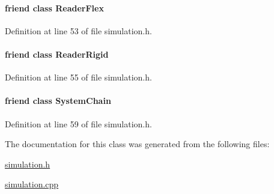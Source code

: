 \paragraph[{Reader\+Flex}]{\setlength{\rightskip}{0pt plus 5cm}friend class {\bf Reader\+Flex}\hspace{0.3cm}{\ttfamily [friend]}}\label{classmknix_1_1_simulation_a1150cceac3e81192653459c61f428621}


Definition at line 53 of file simulation.\+h.

\hypertarget{classmknix_1_1_simulation_a6a45b3f2d8b6c9e516334b46caf0cbb7}{}
\paragraph[{Reader\+Rigid}]{\setlength{\rightskip}{0pt plus 5cm}friend class {\bf Reader\+Rigid}\hspace{0.3cm}{\ttfamily [friend]}}\label{classmknix_1_1_simulation_a6a45b3f2d8b6c9e516334b46caf0cbb7}


Definition at line 55 of file simulation.\+h.

\hypertarget{classmknix_1_1_simulation_a80deec2a4a2062bc1eac766a8c0139da}{}
\paragraph[{System\+Chain}]{\setlength{\rightskip}{0pt plus 5cm}friend class {\bf System\+Chain}\hspace{0.3cm}{\ttfamily [friend]}}\label{classmknix_1_1_simulation_a80deec2a4a2062bc1eac766a8c0139da}


Definition at line 59 of file simulation.\+h.



The documentation for this class was generated from the following files\+:\begin{DoxyCompactItemize}
\item 
\hyperlink{simulation_8h}{simulation.\+h}\item 
\hyperlink{simulation_8cpp}{simulation.\+cpp}\end{DoxyCompactItemize}
